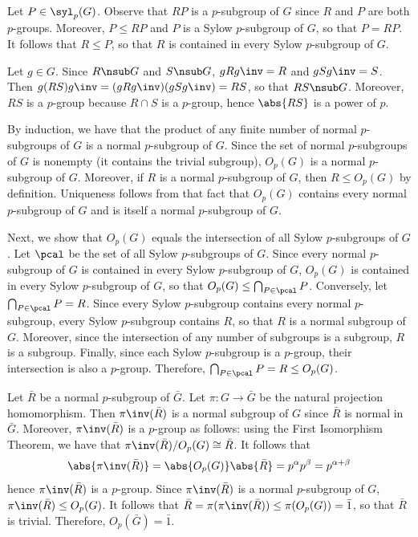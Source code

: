 \begin{solenum}
	\item Let $P \in \syl_p(G)$.
	Observe that $RP$ is a $p$-subgroup of $G$ since $R$ and $P$ are both $p$-groups.
	Moreover, $P \leq RP$ and $P$ is a Sylow $p$-subgroup of $G$, so that $P = RP$.
	It follows that $R \leq P$, so that $R$ is contained in every Sylow $p$-subgroup of $G$.
	\item Let $g \in G$.
	Since $R \nsub G$ and $S \nsub G$, $gRg\inv = R$ and $gSg\inv = S$.
	Then $g(RS)g\inv = (gRg\inv)(gSg\inv) = RS$, so that $RS \nsub G$.
	Moreover, $RS$ is a $p$-group because $R \cap S$ is a $p$-group, hence $\abs{RS}$ is a power of $p$.
	\item By induction, we have that the product of any finite number of normal $p$-subgroups of $G$ is a normal $p$-subgroup of $G$.
	Since the set of normal $p$-subgroups of $G$ is nonempty (it contains the trivial subgroup), $O_p(G)$ is a normal $p$-subgroup of $G$.
	Moreover, if $R$ is a normal $p$-subgroup of $G$, then $R \leq O_p(G)$ by definition.
	Uniqueness follows from that fact that $O_p(G)$ contains every normal $p$-subgroup of $G$ and is itself a normal $p$-subgroup of $G$.
	
	Next, we show that $O_p(G)$ equals the intersection of all Sylow $p$-subgroups of $G$.
	Let $\pcal$ be the set of all Sylow $p$-subgroups of $G$.
	Since every normal $p$-subgroup of $G$ is contained in every Sylow $p$-subgroup of $G$, $O_p(G)$ is contained in every Sylow $p$-subgroup of $G$, so that $O_p(G) \leq \bigcap_{P \in \pcal} P$.
	Conversely, let $\bigcap_{P \in \pcal} P = R$.
	Since every Sylow $p$-subgroup contains every normal $p$-subgroup, every Sylow $p$-subgroup contains $R$, so that $R$ is a normal subgroup of $G$.
	Moreover, since the intersection of any number of subgroups is a subgroup, $R$ is a subgroup.
	Finally, since each Sylow $p$-subgroup is a $p$-group, their intersection is also a $p$-group.
	Therefore, $\bigcap_{P \in \pcal} P = R \leq O_p(G)$.
	\item Let $\bar R$ be a normal $p$-subgroup of $\bar G$.
	Let $\pi \colon G \to \bar G$ be the natural projection homomorphism.
	Then $\pi\inv(\bar R)$ is a normal subgroup of $G$ since $\bar R$ is normal in $\bar G$.
	Moreover, $\pi\inv(\bar R)$ is a $p$-group as follows: using the First Isomorphism Theorem, we have that $\pi\inv(\bar R)/O_p(G) \cong \bar R$.
	It follows that
	\[
		\abs{\pi\inv(\bar R)} = \abs{O_p(G)}\abs{\bar R} = p^\alpha p^\beta = p^{\alpha + \beta}
	\]
	hence $\pi\inv(\bar R)$ is a $p$-group.
	Since $\pi\inv(\bar R)$ is a normal $p$-subgroup of $G$, $\pi\inv(\bar R) \leq O_p(G)$.
	It follows that $\bar R = \pi(\pi\inv(\bar R)) \leq \pi(O_p(G)) = \bar 1$, so that $\bar R$ is trivial.
	Therefore, $O_p(\bar G) = \bar 1$.
\end{solenum}

